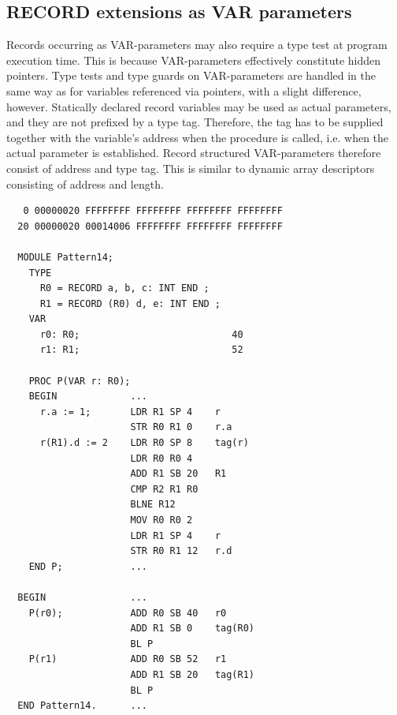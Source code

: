 \subsection{RECORD extensions as VAR parameters}
Records occurring as VAR-parameters may also require a type test at program execution time. This is
because VAR-parameters effectively constitute hidden pointers. Type tests and type guards on
VAR-parameters are handled in the same way as for variables referenced via pointers, with a slight
difference, however. Statically declared record variables may be used as actual parameters, and they
are not prefixed by a type tag. Therefore, the tag has to be supplied together with the variable's
address when the procedure is called, i.e. when the actual parameter is established. Record structured
VAR-parameters therefore consist of address and type tag. This is similar to dynamic array descriptors
consisting of address and length.
\begin{verbatim}
   0 00000020 FFFFFFFF FFFFFFFF FFFFFFFF FFFFFFFF
  20 00000020 00014006 FFFFFFFF FFFFFFFF FFFFFFFF
  
  MODULE Pattern14;
    TYPE
      R0 = RECORD a, b, c: INT END ;
      R1 = RECORD (R0) d, e: INT END ;
    VAR
      r0: R0;                           40
      r1: R1;                           52
  
    PROC P(VAR r: R0);
    BEGIN             ...
      r.a := 1;       LDR R1 SP 4    r
                      STR R0 R1 0    r.a
      r(R1).d := 2    LDR R0 SP 8    tag(r)
                      LDR R0 R0 4    
                      ADD R1 SB 20   R1
                      CMP R2 R1 R0   
                      BLNE R12       
                      MOV R0 R0 2    
                      LDR R1 SP 4    r
                      STR R0 R1 12   r.d
    END P;            ...
  
  BEGIN               ...
    P(r0);            ADD R0 SB 40   r0
                      ADD R1 SB 0    tag(R0)
                      BL P           
    P(r1)             ADD R0 SB 52   r1
                      ADD R1 SB 20   tag(R1)
                      BL P
  END Pattern14.      ...
\end{verbatim}

